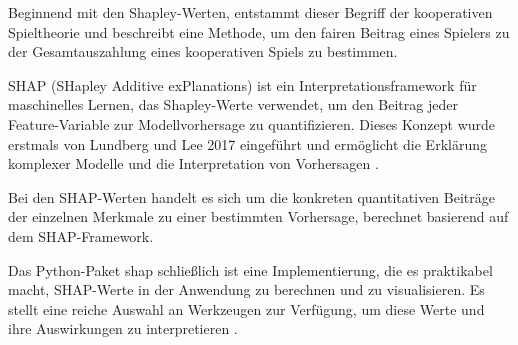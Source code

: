 Beginnend mit den Shapley-Werten, entstammt dieser Begriff der kooperativen Spieltheorie und beschreibt eine Methode, 
um den fairen Beitrag eines Spielers zu der Gesamtauszahlung eines kooperativen Spiels zu bestimmen. 

SHAP (SHapley Additive exPlanations) ist ein Interpretationsframework für maschinelles Lernen, 
das Shapley-Werte verwendet, um den Beitrag jeder Feature-Variable zur Modellvorhersage 
zu quantifizieren. Dieses Konzept wurde erstmals von Lundberg und Lee 2017 eingeführt und 
ermöglicht die Erklärung komplexer Modelle und die Interpretation von Vorhersagen \cite[S. 1]{NIPS2017_8a20a862}.

Bei den SHAP-Werten handelt es sich um die konkreten quantitativen Beiträge der einzelnen Merkmale 
zu einer bestimmten Vorhersage, berechnet basierend auf dem SHAP-Framework.

Das Python-Paket \textsf{shap} schließlich ist eine Implementierung, die es praktikabel macht, SHAP-Werte in der Anwendung zu berechnen 
und zu visualisieren. Es stellt eine reiche Auswahl an Werkzeugen zur Verfügung, um diese Werte und ihre Auswirkungen zu interpretieren \cite[S. 14]{Molnar_2023}.



